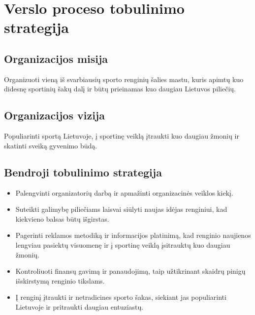 \documentclass{VUMIFPSkursinis}
\begin{document}
\section{Verslo proceso tobulinimo strategija} \label{versloProcesoTobulinimoStrategija}
	\subsection{Organizacijos misija} \label{versloProcesoTobulinimoStrategija_vizija}
		Organizuoti vieną iš svarbiausių sporto renginių šalies mastu, kuris apimtų kuo didesnę sportinių šakų dalį ir būtų prieinamas kuo daugiau Lietuvos piliečių.
	\subsection{Organizacijos vizija} \label{versloProcesoTobulinimoStrategija_misija}
		Populiarinti sportą Lietuvoje, į sportinę veiklą įtraukti kuo daugiau žmonių ir skatinti sveiką gyvenimo būdą.
	\subsection{Bendroji tobulinimo strategija} \label{versloProcesoTobulinimoStrategija_bendroji}
		\begin{itemize}
			\item Palengvinti organizatorių darbą ir apmažinti organizacinės veiklos kiekį.
      \item Suteikti galimybę piliečiams laisvai siūlyti naujas idėjas renginiui, kad kiekvieno balsas būtų išgirstas.
      \item Pagerinti reklamos metodiką ir informacijos platinimą, kad renginio naujienos lengviau pasiektų visuomenę ir į sportinę veiklą įsitrauktų kuo daugiau žmonių.
      \item Kontroliuoti finansų gavimą ir panaudojimą, taip užtikrinant skaidrų pinigų išskirstymą renginio tikslams.
      \item Į renginį įtraukti ir netradicines sporto šakas, siekiant jas populiarinti Lietuvoje ir pritraukti daugiau entuziastų. 
		\end{itemize}
\end{document}
